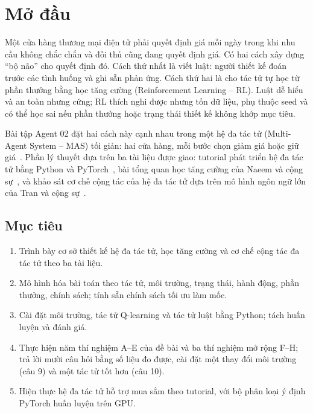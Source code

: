 \chapter*{Mở đầu}

Một cửa hàng thương mại điện tử phải quyết định giá mỗi ngày trong khi nhu cầu không chắc chắn và đối thủ cũng đang
quyết định giá. Có hai cách xây dựng ``bộ não'' cho quyết định đó. Cách thứ nhất là viết luật: người thiết kế đoán trước
các tình huống và ghi sẵn phản ứng. Cách thứ hai là cho tác tử tự học từ phần thưởng bằng học tăng cường (Reinforcement
Learning -- RL). Luật dễ hiểu và an toàn nhưng cứng; RL thích nghi được nhưng tốn dữ liệu, phụ thuộc seed và có thể học
sai nếu phần thưởng hoặc trạng thái thiết kế không khớp mục tiêu.

Bài tập Agent 02 đặt hai cách này cạnh nhau trong một hệ đa tác tử (Multi-Agent System -- MAS) tối giản: hai cửa hàng,
mỗi bước chọn giảm giá hoặc giữ giá~\cite{lab02}. Phần lý thuyết dựa trên ba tài liệu được giao: tutorial phát triển hệ đa
tác tử bằng Python và PyTorch~\cite{ch1:tutorial}, bài tổng quan học tăng cường của Naeem và cộng sự~\cite{ch2:naeem}, và
khảo sát cơ chế cộng tác của hệ đa tác tử dựa trên mô hình ngôn ngữ lớn của Tran và cộng sự~\cite{ch3:tran}.

\section*{Mục tiêu}
\begin{enumerate}
  \item Trình bày cơ sở thiết kế hệ đa tác tử, học tăng cường và cơ chế cộng tác đa tác tử theo ba tài liệu.
  \item Mô hình hóa bài toán theo tác tử, môi trường, trạng thái, hành động, phần thưởng, chính sách; tính sẵn chính sách
    tối ưu làm mốc.
  \item Cài đặt môi trường, tác tử Q-learning và tác tử luật bằng Python; tách huấn luyện và đánh giá.
  \item Thực hiện năm thí nghiệm A--E của đề bài và ba thí nghiệm mở rộng F--H; trả lời mười câu hỏi bằng số liệu đo được,
    cài đặt một thay đổi môi trường (câu 9) và một tác tử tốt hơn (câu 10).
  \item Hiện thực hệ đa tác tử hỗ trợ mua sắm theo tutorial, với bộ phân loại ý định PyTorch huấn luyện trên GPU.
\end{enumerate}

